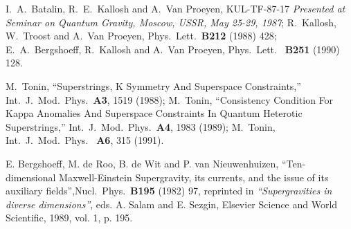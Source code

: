 \documentclass[a4paper,12pt]{article}
\begin{document}
\begin{thebibliography}{99}
I.~A.~Batalin, R.~E.~Kallosh and A.~Van Proeyen, KUL-TF-87-17
{\it Presented at Seminar on Quantum Gravity, Moscow, USSR, May 25-29, 1987}; 
R.~Kallosh, W.~Troost and A.~Van Proeyen, Phys.\ Lett.\  {\bf B212}
(1988) 428;  
E.~A.~Bergshoeff, R.~Kallosh and A.~Van Proeyen, Phys.\ Lett.\  {\bf
  B251} (1990) 128.  

    M.~Tonin, ``Superstrings, K Symmetry And Superspace Constraints,''
  Int.\ J.\ Mod.\ Phys.\ {\bf A3}, 1519 (1988); M.~Tonin,
  ``Consistency Condition For Kappa Anomalies And Superspace
  Constraints In Quantum Heterotic Superstrings,'' Int.\ J.\ Mod.\ 
  Phys.\ {\bf A4}, 1983 (1989); M.~Tonin, Int.\ J.\ Mod.\ Phys.\ {\bf
    A6}, 315 (1991).

  E. Bergshoeff, M. de Roo, B. de Wit and P. van Nieuwenhuizen,
  ``Ten-dimensional Maxwell-Einstein Supergravity, its currents, and
  the issue of its auxiliary fields'',Nucl.\ Phys.\ {\bf B195}
  (1982) 97, reprinted in {\it ``Supergravities in diverse dimensions''}, 
  eds. A. Salam and E. Sezgin, Elsevier Science and World Scientific,
  1989, vol. 1, p. 195.

\end{thebibliography}
\end{document}
